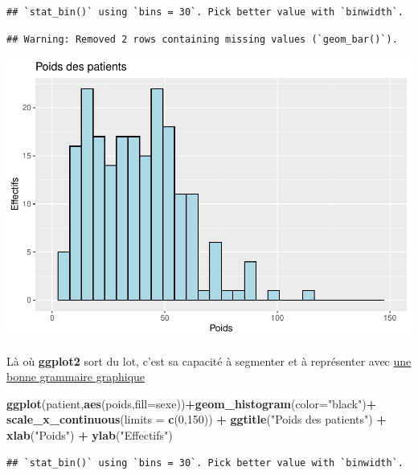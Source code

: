 \documentclass[
]{book}
\newenvironment{Shaded}{\begin{snugshade}}{\end{snugshade}}
\newcommand{\AttributeTok}[1]{\textcolor[rgb]{0.13,0.29,0.53}{#1}}
\newcommand{\DecValTok}[1]{\textcolor[rgb]{0.00,0.00,0.81}{#1}}
\newcommand{\FunctionTok}[1]{\textcolor[rgb]{0.13,0.29,0.53}{\textbf{#1}}}
\newcommand{\NormalTok}[1]{#1}
\newcommand{\SpecialCharTok}[1]{\textcolor[rgb]{0.81,0.36,0.00}{\textbf{#1}}}
\newcommand{\StringTok}[1]{\textcolor[rgb]{0.31,0.60,0.02}{#1}}
\begin{document}
\begin{verbatim}
## `stat_bin()` using `bins = 30`. Pick better value with `binwidth`.
\end{verbatim}

\begin{verbatim}
## Warning: Removed 2 rows containing missing values (`geom_bar()`).
\end{verbatim}

\includegraphics{_main_files/figure-latex/ggplot7-1.pdf}

Là où \textbf{ggplot2} sort du lot, c'est sa capacité à segmenter et à représenter
avec \href{https://link.springer.com/book/10.1007/0-387-28695-0}{une bonne grammaire graphique}

\begin{Shaded}
\begin{Highlighting}[]
\FunctionTok{ggplot}\NormalTok{(patient,}\FunctionTok{aes}\NormalTok{(poids,}\AttributeTok{fill=}\NormalTok{sexe))}\SpecialCharTok{+}\FunctionTok{geom\_histogram}\NormalTok{(}\AttributeTok{color=}\StringTok{"black"}\NormalTok{)}\SpecialCharTok{+}
  \FunctionTok{scale\_x\_continuous}\NormalTok{(}\AttributeTok{limits =} \FunctionTok{c}\NormalTok{(}\DecValTok{0}\NormalTok{,}\DecValTok{150}\NormalTok{)) }\SpecialCharTok{+} 
  \FunctionTok{ggtitle}\NormalTok{(}\StringTok{"Poids des patients"}\NormalTok{) }\SpecialCharTok{+} 
  \FunctionTok{xlab}\NormalTok{(}\StringTok{"Poids"}\NormalTok{) }\SpecialCharTok{+} 
  \FunctionTok{ylab}\NormalTok{(}\StringTok{"Effectifs"}\NormalTok{)}
\end{Highlighting}
\end{Shaded}

\begin{verbatim}
## `stat_bin()` using `bins = 30`. Pick better value with `binwidth`.
\end{verbatim}
\end{document}
